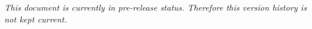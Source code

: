 \textit{This document is currently in pre-release status.  Therefore this version history is not kept current.}

\begin{versionhistory}
\end{versionhistory}
